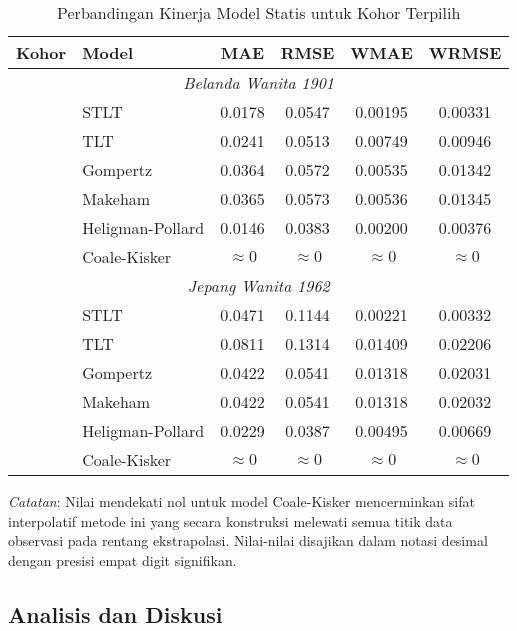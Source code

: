 \begin{table}[htbp]
\centering
\caption{Perbandingan Kinerja Model Statis untuk Kohor Terpilih}
\label{tab:model_comparison_static}
\small
\begin{tabular}{clcccc}
\hline
\textbf{Kohor} & \textbf{Model} & \textbf{MAE} & \textbf{RMSE} & \textbf{WMAE} & \textbf{WRMSE} \\
\hline
\multicolumn{6}{c}{\textit{Belanda Wanita 1901}} \\
\hline
& STLT & 0.0178 & 0.0547 & 0.00195 & 0.00331 \\
& TLT & 0.0241 & 0.0513 & 0.00749 & 0.00946 \\
& Gompertz & 0.0364 & 0.0572 & 0.00535 & 0.01342 \\
& Makeham & 0.0365 & 0.0573 & 0.00536 & 0.01345 \\
& Heligman-Pollard & 0.0146 & 0.0383 & 0.00200 & 0.00376 \\
& Coale-Kisker & $\approx 0$ & $\approx 0$ & $\approx 0$ & $\approx 0$ \\
\hline
\multicolumn{6}{c}{\textit{Jepang Wanita 1962}} \\
\hline
& STLT & 0.0471 & 0.1144 & 0.00221 & 0.00332 \\
& TLT & 0.0811 & 0.1314 & 0.01409 & 0.02206 \\
& Gompertz & 0.0422 & 0.0541 & 0.01318 & 0.02031 \\
& Makeham & 0.0422 & 0.0541 & 0.01318 & 0.02032 \\
& Heligman-Pollard & 0.0229 & 0.0387 & 0.00495 & 0.00669 \\
& Coale-Kisker & $\approx 0$ & $\approx 0$ & $\approx 0$ & $\approx 0$ \\
\hline
\end{tabular}
\begin{tablenotes}
\small
\item \textit{Catatan}: Nilai mendekati nol untuk model Coale-Kisker mencerminkan sifat interpolatif metode ini yang secara konstruksi melewati semua titik data observasi pada rentang ekstrapolasi. Nilai-nilai disajikan dalam notasi desimal dengan presisi empat digit signifikan.
\end{tablenotes}
\end{table}

\subsection{Analisis dan Diskusi}

